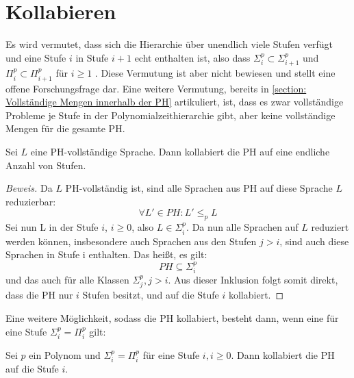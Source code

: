 \section{Kollabieren} \label{section: Kollabieren der PH}
Es wird vermutet, dass sich die Hierarchie über unendlich viele Stufen verfügt und eine Stufe $i$ in Stufe $i + 1$ echt enthalten ist,
also dass $\Sigma^p_i \subset \Sigma^p_{i+1}$ und $\Pi^p_i \subset \Pi^p_{i+1}$ für $i \geq 1$ \cite{arora_computational_2009}. Diese Vermutung ist aber nicht bewiesen und stellt eine offene
Forschungsfrage dar. Eine weitere Vermutung, bereits in \ref{section: Vollständige Mengen innerhalb der PH} artikuliert,  ist, dass es zwar vollständige Probleme je Stufe in der Polynomialzeithierarchie gibt, aber keine vollständige Mengen für die gesamte PH.
\begin{theorem}
    Sei $L$ eine PH-vollständige Sprache. Dann kollabiert die PH auf eine endliche Anzahl von Stufen. 
\end{theorem}

\begin{proof}[Beweis] \cite{arora_computational_2009}
    Da $L$ PH-vollständig ist, sind alle Sprachen aus PH auf diese Sprache $L$ reduzierbar:
    $$
    \forall L' \in PH: L' \leq_p L
    $$
    Sei nun L in der Stufe $i$, $i \geq 0$, also $L \in \Sigma^p_i$. Da nun alle Sprachen auf $L$ reduziert werden können, insbesondere
    auch Sprachen aus den Stufen $j > i$, sind auch diese Sprachen in Stufe i enthalten.
    Das heißt, es gilt: 
    $$
    PH \subseteq \Sigma^p_i
    $$ 
    und das auch für alle Klassen $\Sigma^p_j, j> i$.
    Aus dieser Inklusion folgt somit direkt, dass die PH nur $i$ Stufen besitzt, und auf die Stufe $i$ kollabiert.
\end{proof}

Eine weitere Möglichkeit, sodass die PH kollabiert, besteht dann, wenn eine für eine Stufe $\Sigma^p_i = \Pi^p_i$ gilt:

\begin{theorem}
    Sei $p$ ein Polynom und $\Sigma^p_i = \Pi^p_i$ für eine Stufe $i, i \geq 0$. Dann kollabiert die PH auf die Stufe $i$.
\end{theorem}

